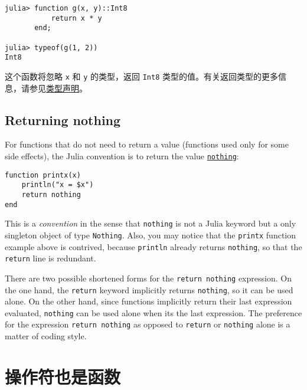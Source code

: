 \begin{verbatim}
julia> function g(x, y)::Int8
           return x * y
       end;

julia> typeof(g(1, 2))
Int8
\end{verbatim}



这个函数将忽略 \texttt{x} 和 \texttt{y} 的类型，返回 \texttt{Int8} 类型的值。有关返回类型的更多信息，请参见\href{@ref}{类型声明}。



\hypertarget{720555615078928815}{}


\subsection{Returning nothing}



For functions that do not need to return a value (functions used only for some side effects), the Julia convention is to return the value \hyperlink{9331422207248206047}{\texttt{nothing}}:




\begin{verbatim}
function printx(x)
    println("x = $x")
    return nothing
end
\end{verbatim}



This is a \emph{convention} in the sense that \texttt{nothing} is not a Julia keyword but a only singleton object of type \texttt{Nothing}. Also, you may notice that the \texttt{printx} function example above is contrived, because \texttt{println} already returns \texttt{nothing}, so that the \texttt{return} line is redundant.



There are two possible shortened forms for the \texttt{return nothing} expression. On the one hand, the \texttt{return} keyword implicitly returns \texttt{nothing}, so it can be used alone. On the other hand, since functions implicitly return their last expression evaluated, \texttt{nothing} can be used alone when it{\textquotesingle}s the last expression. The preference for the expression \texttt{return nothing} as opposed to \texttt{return} or \texttt{nothing} alone is a matter of coding style.



\hypertarget{6095699413160695994}{}


\section{操作符也是函数}



